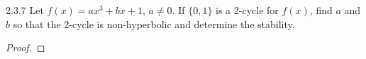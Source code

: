 \begin{problem}{2.3.7}
  Let $f(x) = ax^3 + bx + 1$, $a\neq 0$. If $\{0, 1\}$ is a 2-cycle for $f(x)$,
  find $a$ and $b$ so that the 2-cycle is non-hyperbolic and determine the stability.
\end{problem}

\begin{proof}
\end{proof}
\newpage
